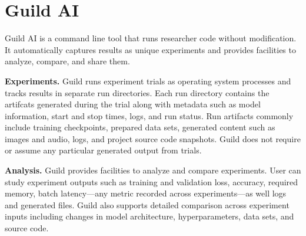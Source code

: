 \documentclass{article}
\begin{document}

\printAffiliationsAndNotice{\sysmlEqualContribution}

\section{Guild AI}

Guild AI is a command line tool that runs researcher code without
modification. It automatically captures results as unique experiments
and provides facilities to analyze, compare, and share them.

\textbf{Experiments.} Guild runs experiment trials as operating system
processes and tracks results in separate run directories. Each run
directory contains the artifcats generated during the trial along with
metadata such as model information, start and stop times, logs, and
run status. Run artifacts commonly include training checkpoints,
prepared data sets, generated content such as images and audio, logs,
and project source code snapshots. Guild does not require or assume
any particular generated output from trials.

\textbf{Analysis.} Guild provides facilities to analyze and compare
experiments. User can study experiment outputs such as training and
validation loss, accuracy, required memory, batch latency---any metric
recorded across experiments---as well logs and generated files. Guild
also supports detailed comparison across experiment inputs including
changes in model architecture, hyperparameters, data sets, and source
code.
\end{document}
